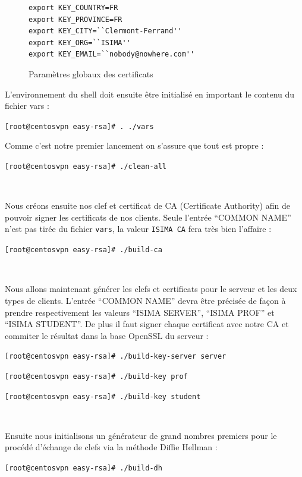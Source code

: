 \begin{figure}[H]
	\begin{center}
		\begin{minipage}{0.90\textwidth}
			\begin{lstlisting}[frame=trBL]
export KEY_COUNTRY=FR
export KEY_PROVINCE=FR
export KEY_CITY=``Clermont-Ferrand''
export KEY_ORG=``ISIMA''
export KEY_EMAIL=``nobody@nowhere.com''
			\end{lstlisting}
		\end{minipage}
	\end{center}
	\caption{Paramètres globaux des certificats}
	\label{easy-rsa-globals}
\end{figure}

L'environnement du shell doit ensuite être initialisé en important le contenu du fichier vars :

\verb|[root@centosvpn easy-rsa]# . ./vars|

Comme c'est notre premier lancement on s'assure que tout est propre :

\verb|[root@centosvpn easy-rsa]# ./clean-all|

~

Nous créons ensuite nos clef et certificat de CA (Certificate Authority) afin de pouvoir signer les certificats de nos clients. Seule l'entrée ``COMMON NAME'' n'est pas tirée du fichier \verb|vars|, la valeur \verb|ISIMA CA| fera très bien l'affaire :

\verb|[root@centosvpn easy-rsa]# ./build-ca|

~

Nous allons maintenant générer les clefs et certificats pour le serveur et les deux types de clients. L'entrée ``COMMON NAME'' devra être précisée de façon à prendre respectivement les valeurs ``ISIMA SERVER'', ``ISIMA PROF'' et ``ISIMA STUDENT''. De plus il faut signer chaque certificat avec notre CA et commiter le résultat dans la base OpenSSL du serveur :

\verb|[root@centosvpn easy-rsa]# ./build-key-server server|

\verb|[root@centosvpn easy-rsa]# ./build-key prof|

\verb|[root@centosvpn easy-rsa]# ./build-key student|

~

Ensuite nous initialisons un générateur de grand nombres premiers pour le procédé d'échange de clefs via la méthode Diffie Hellman :

\verb|[root@centosvpn easy-rsa]# ./build-dh|

